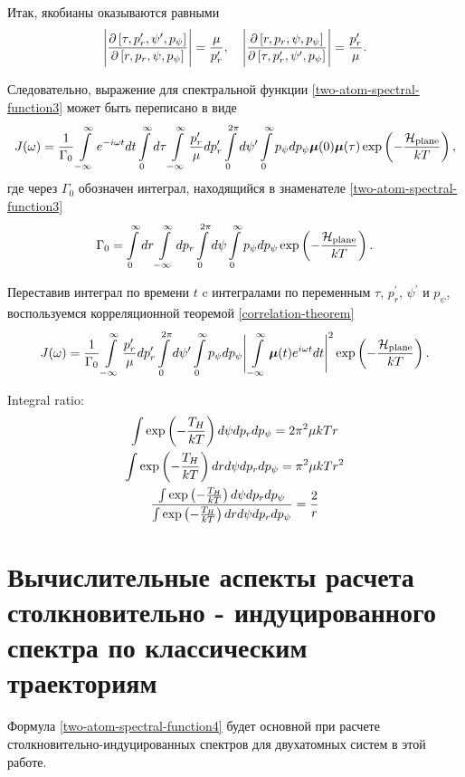Итак, якобианы оказываются равными
\begin{gather}
    \Bigg\vert \frac{\partial \left[ \tau, p_r^\prime, \psi^\prime, p_\psi \right]}{\partial \left[ r, p_r, \psi, p_\psi \right]} \Bigg\vert = \frac{\mu}{p_r^\prime}, \quad \Bigg\vert \frac{\partial \left[ r, p_r, \psi, p_\psi \right]}{\partial \left[ \tau, p_r^\prime, \psi^\prime, p_\psi \right]} \Bigg\vert = \frac{p_r^\prime}{\mu}.
\end{gather}

Следовательно, выражение для спектральной функции \eqref{two-atom-spectral-function3} может быть переписано в виде
\begin{gather}
    J(\omega) = \frac{1}{\Gamma_0} \int\limits_{-\infty}^\infty e^{-i \omega t} dt \int\limits_0^\infty d\tau \int\limits_{-\infty}^\infty \frac{p_r^\prime}{\mu} dp_r^\prime \int\limits_0^{2\pi} d\psi^\prime \int\limits_0^\infty p_\psi dp_\psi \boldsymbol{\mu}(0) \boldsymbol{\mu}(\tau) \exp \left( -\frac{\mathcal{H}_\text{plane}}{kT} \right),
\end{gather}
%
где через $\Gamma_0$ обозначен интеграл, находящийся в знаменателе \eqref{two-atom-spectral-function3}
\begin{gather}
    \Gamma_0 = \int\limits_0^\infty dr \int\limits_{-\infty}^\infty dp_r \int\limits_0^{2\pi} d\psi \int\limits_0^\infty p_\psi dp_\psi \exp \left( -\frac{\mathcal{H}_\text{plane}}{kT} \right).
\end{gather}

Переставив интеграл по времени $t$ c интегралами по переменным $\tau$, $p_r^\prime$, $\psi^\prime$ и $p_\psi$, воспользуемся корреляционной теоремой \eqref{correlation-theorem}
\begin{gather}
    J(\omega) = \frac{1}{\Gamma_0} \int\limits_{-\infty}^\infty \frac{p_r^\prime}{\mu} dp_r^\prime \int\limits_0^{2\pi} d\psi^\prime \int\limits_0^\infty p_\psi dp_\psi \Bigg\vert \int\limits_{-\infty}^\infty \boldsymbol{\mu}(t) e^{i \omega t} dt \Bigg\vert^2 \exp \left( -\frac{\mathcal{H}_\text{plane}}{k T} \right). \label{two-atom-spectral-function4}
\end{gather}

Integral ratio:
\begin{gather}
    \int \exp \left( -\frac{T_H}{kT} \right) d \psi d p_r dp_\psi = 2 \pi^2 \mu k T r \\
    \int \exp \left( -\frac{T_H}{kT} \right) dr d\psi dp_r dp_\psi = \pi^2 \mu k T r^2 \\
    \frac{\int \exp \left( -\frac{T_H}{kT} \right) d\psi dp_r dp_\psi}{\int \exp \left( -\frac{T_H}{k T} \right) dr d\psi dp_r dp_\psi} = \frac{2}{r}
\end{gather}

\section{Вычислительные аспекты расчета столкновительно - индуцированного спектра по классическим траекториям}

Формула \eqref{two-atom-spectral-function4} будет основной при расчете столкновительно-индуцированных спектров для двухатомных систем в этой работе. 

